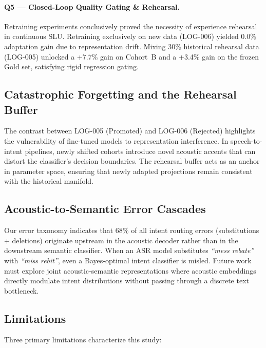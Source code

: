 \documentclass[sigconf,authordraft]{acmart}
\begin{document}
\paragraph{Q5 — Closed-Loop Quality Gating \& Rehearsal.}
Retraining experiments conclusively proved the necessity of experience rehearsal in continuous SLU.
Retraining exclusively on new data (LOG-006) yielded 0.0\% adaptation gain due to representation drift.
Mixing 30\% historical rehearsal data (LOG-005) unlocked a +7.7\% gain on Cohort~B and a +3.4\% gain on
the frozen Gold set, satisfying rigid regression gating.

\subsection{Catastrophic Forgetting and the Rehearsal Buffer}

The contrast between LOG-005 (Promoted) and LOG-006 (Rejected) highlights the vulnerability of
fine-tuned models to representation interference. In speech-to-intent pipelines, newly shifted
cohorts introduce novel acoustic accents that can distort the classifier's decision boundaries.
The rehearsal buffer acts as an anchor in parameter space, ensuring that newly adapted projections
remain consistent with the historical manifold.

\subsection{Acoustic-to-Semantic Error Cascades}

Our error taxonomy indicates that 68\% of all intent routing errors (substitutions + deletions)
originate upstream in the acoustic decoder rather than in the downstream semantic classifier.
When an ASR model substitutes \emph{``mess rebate''} with \emph{``miss rebit''}, even a Bayes-optimal
intent classifier is misled. Future work must explore joint acoustic-semantic representations where
acoustic embeddings directly modulate intent distributions without passing through a discrete text bottleneck.

\subsection{Limitations}

Three primary limitations characterize this study:
\end{document}
